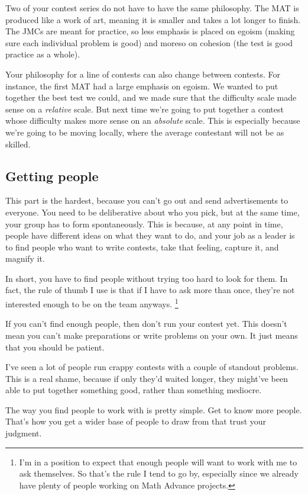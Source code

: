 \documentclass[points=false]{bounce}
\begin{document}
Two of your contest series do not have to have the same philosophy. The MAT is produced like a work of art, meaning it is smaller and takes a lot longer to finish. The JMCs are meant for practice, so less emphasis is placed on egoism (making sure each individual problem is good) and moreso on cohesion (the test is good practice as a whole).

Your philosophy for a line of contests can also change between contests. For instance, the first MAT had a large emphasis on egoism. We wanted to put together the best test we could, and we made sure that the difficulty scale made sense on a \emph{relative} scale. But next time we're going to put together a contest whose difficulty makes more sense on an \emph{absolute} scale. This is especially because we're going to be moving locally, where the average contestant will not be as skilled.

\subsection{Getting people}

This part is the hardest, because you can't go out and send advertisements to everyone.
You need to be deliberative about who you pick, but at the same time,
your group has to form spontaneously.
This is because, at any point in time, people have different ideas on what they want to do,
and your job as a leader is to find people who want to write contests,
take that feeling, capture it, and magnify it.

In short, you have to find people without
trying too hard to look for them.
In fact, the rule of thumb I use
is that if I have to ask more than once,
they're not interested enough to be on the team anyways.
\footnote{I'm in a position to expect that enough people
will want to work with me to ask themselves.
So that's the rule I tend to go by,
especially since we already have plenty of people
working on Math Advance projects.}

If you can't find enough people,
then don't run your contest yet.
This doesn't mean you can't make preparations
or write problems on your own.
It just means that you should be patient.

I've seen a lot of people run crappy contests
with a couple of standout problems.
This is a real shame, because if only they'd waited longer,
they might've been able to put together something good,
rather than something mediocre.

The way you find people to work with is pretty simple.
Get to know more people.
That's how you get a wider base of people to draw from
that trust your judgment.
\end{document}
